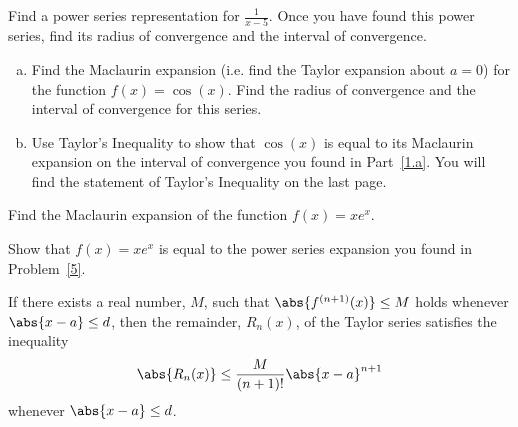 \documentclass[12pt]{amsart}
\begin{document}
\newpage
\begin{thm}
  Find a power series representation for $\displaystyle{\frac{1}{x - 5}}$.
  Once you have found this power series, find its radius of convergence and the interval of convergence.
\end{thm}

\newpage

\begin{thm}
  \begin{enumerate}[(a)]
  \item\label{1.a}
    Find the Maclaurin expansion (i.e. find the Taylor expansion about $a = 0$) for the function $f(x) = \cos(x)$.
    Find the radius of convergence and the interval of convergence for this series.
    \vspace{4in}
  \item
    Use Taylor's Inequality to show that $\cos(x)$ is equal to its Maclaurin expansion on the interval of convergence you found in Part~\ref{1.a}.
    You will find the statement of Taylor's Inequality on the last page.
  \end{enumerate}
\end{thm}

\newpage

\begin{thm}\label{5}
  Find the Maclaurin expansion of the function $f(x) = xe^x$.
\end{thm}

\newpage

\begin{thm}
  Show that $f(x) = xe^x$ is equal to the power series expansion you found in Problem~\ref{5}.
\end{thm}

\newpage

\begin{thm}
  If there exists a real number, $M$, such that $\abs{f^{(n+1)}(x)} \leq M$ holds whenever $\abs{x - a} \leq d$, then the remainder, $R_n(x)$, of the Taylor series satisfies the inequality
  $$\abs{R_n(x)} \leq \frac{M}{(n+1)!} \abs{x - a}^{n+1}$$
  whenever $\abs{x - a} \leq d$.
\end{thm}
\end{document}
